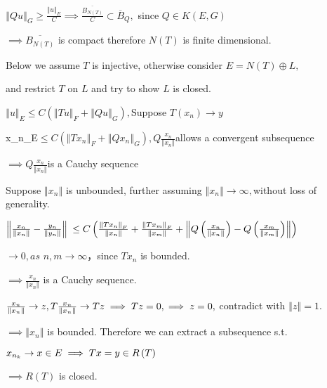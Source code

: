 \documentclass{article}
\begin{document}
$\left\Vert Qu\right\Vert _{G}\geq \frac{\left\Vert u\right\Vert _{E}}{C}%
\implies \frac{\overline{B_{N\left( T\right) }}}{C}\subset \overline{B}_{Q},$%
since $Q\in K\left( E,G\right) $

$\implies \overline{B_{N\left( T\right) }}$ is compact therefore $N\left(
T\right) $ is finite dimensional.

Below we assume $T$ is injective, otherwise consider $E=N\left( T\right)
\oplus L,$

and restrict $T$ on $L$ and try to show $L$ is closed.

\bigskip $\left\Vert u\right\Vert _{E}\leq C\left( \left\Vert Tu\right\Vert
_{F}+\left\Vert Qu\right\Vert _{G}\right) ,$Suppose $T\left( x_{n}\right)
\rightarrow y$

\left\Vert x_{n}\right\Vert _{E}$\leq C\left( \left\Vert Tx_{n}\right\Vert
_{F}+\left\Vert Qx_{n}\right\Vert _{G}\right) ,Q\frac{x_{n}}{\left\Vert
x_{n}\right\Vert }$allows a convergent subsequence 

$\implies Q\frac{x_{n}}{\left\Vert x_{n}\right\Vert }$is a Cauchy sequence

Suppose $\left\Vert x_{n}\right\Vert $ is unbounded, further assuming $%
\left\Vert x_{n}\right\Vert \rightarrow \infty ,$without loss of generality.

$\left\Vert \frac{x_{n}}{\left\Vert x_{n}\right\Vert }-\frac{y_{n}}{%
\left\Vert y_{n}\right\Vert }\right\Vert $ $\leq C\left( \frac{\left\Vert
Tx_{n}\right\Vert _{F}}{\left\Vert x_{n}\right\Vert }+\frac{\left\Vert
Tx_{m}\right\Vert _{F}}{\left\Vert x_{m}\right\Vert }+\left\Vert Q\left( 
\frac{x_{n}}{\left\Vert x_{n}\right\Vert }\right) -Q\left( \frac{x_{m}}{%
\left\Vert x_{m}\right\Vert }\right) \right\Vert \right) $

$\rightarrow 0,as$ $n,m\rightarrow \infty ， $since $Tx_{n}$ is
bounded.

$\implies \frac{x_{n}}{\left\Vert x_{n}\right\Vert }$ is a Cauchy sequence. 

$\frac{x_{n}}{\left\Vert x_{n}\right\Vert }\rightarrow z,T\frac{x_{n}}{%
\left\Vert x_{n}\right\Vert }\rightarrow Tz\implies Tz=0,\implies z=0,$%
contradict with $\left\Vert z\right\Vert =1.$

$\implies \left\Vert x_{n}\right\Vert $ is bounded. Therefore we can extract
a subsequence s.t.

$\bigskip x_{n_{k}}\rightarrow x\in E\implies Tx=y\in R\left( T\right) $

$\implies R\left( T\right) $ is closed.
\end{document}
